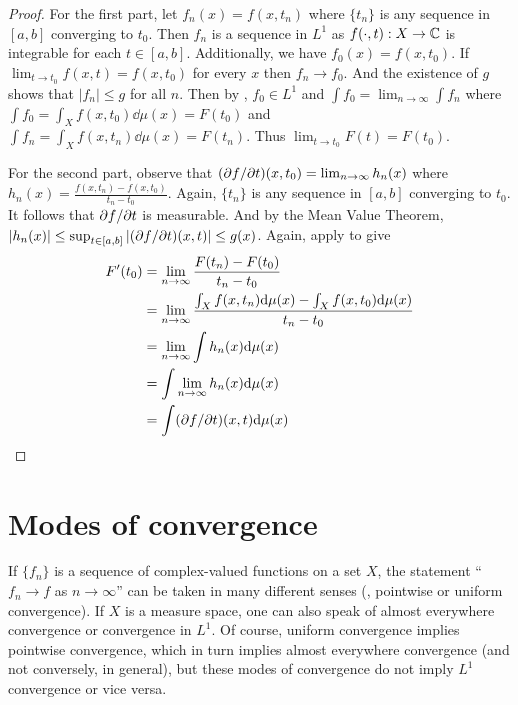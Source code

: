 \begin{proof}
    For the first part, let $f_n(x) = f(x, t_n)$ where $\{ t_n \}$ is any sequence in $[a, b]$ converging to $t_0$.
    Then ${f_n}$ is a sequence in $L^1$ as $f(\cdot, t): X \to \mathbb{C}$ is integrable for each $t \in [a, b]$.
    Additionally, we have $f_0(x) = f(x, t_0)$.
    If $\lim_{t \to t_0} f(x,t) = f(x, t_0)$ for every $x$ then $f_n \to f_0$.
    And the existence of $g$ shows that $|f_n| \le g$ for all $n$.
    Then by , $f_0 \in L^1$ and $\int f_0 = \lim_{n \to \infty} \int f_n$ where $\int f_0 = \int_{X} f(x, t_0) \dd \mu(x) = F(t_0)$ and $\int f_n = \int_{X} f(x, t_n) \dd \mu(x) = F(t_n)$.
    Thus $\lim_{t \to t_0} F(t) = F(t_0)$.

    For the second part, observe that $(\partial f / \partial t)(x,t_0) = \lim_{n \to \infty} h_n(x)$ where $h_n(x) = \frac{f(x, t_n) - f(x, t_0)}{t_n - t_0}$.
    Again, $\{ t_n \}$ is any sequence in $[a, b]$ converging to $t_0$.
    It follows that $\partial f / \partial t$ is measurable.
    And by the Mean Value Theorem, $|h_n(x)| \le \sup_{t \in [a, b]} |(\partial f / \partial t)(x, t)| \le g(x)$.
    Again, apply  to give
    \begin{align}
        F'(t_0) &= \lim_{n \to \infty} \frac{F(t_n) - F(t_0)}{t_n - t_0} \\
        &= \lim_{n \to \infty} \frac{\int_X f(x,t_n) \mathrm{d} \mu(x) - \int_X f(x,t_0) \mathrm{d} \mu(x)}{t_n - t_0} \\
        &= \lim_{n \to \infty} \int h_n(x) \mathrm{d} \mu(x) \\
        &= \int \lim_{n \to \infty} h_n(x) \mathrm{d} \mu(x) \\
        &= \int (\partial f / \partial t)(x,t) \mathrm{d} \mu(x)
    \end{align}
\end{proof}

\section{Modes of convergence}

If $\{ f_n \}$ is a sequence of complex-valued functions on a set $X$, the statement ``$f_n \to f$ as $n \to \infty$'' can be taken in many different senses (\eg, pointwise or uniform convergence).
If $X$ is a measure space, one can also speak of almost everywhere convergence or convergence in $L^1$.
Of course, uniform convergence implies pointwise convergence, which in turn implies almost everywhere convergence (and not conversely, in general), but these modes of convergence do not imply $L^1$ convergence or vice versa. 


